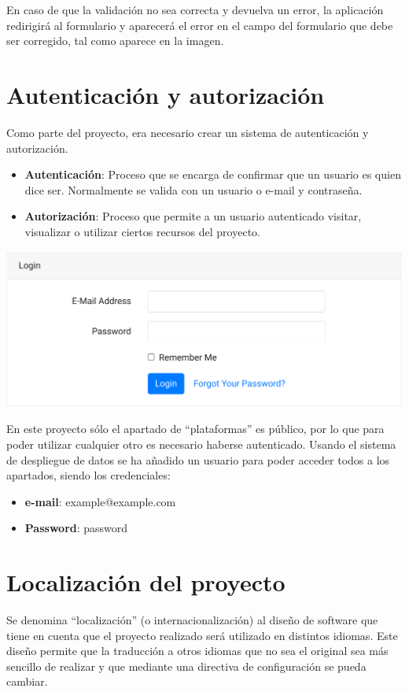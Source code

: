 \documentclass{\ClassPath/viu-tfm-template}
\begin{document}
En caso de que la validación no sea correcta y devuelva un error, la aplicación redirigirá al formulario y aparecerá el error en el campo del formulario que debe ser corregido, tal como aparece en la imagen.

\section{Autenticación y autorización}
Como parte del proyecto, era necesario crear un sistema de autenticación y autorización.

\vspace{-1em}
\begin{itemize}
    \item \textbf{Autenticación}: Proceso que se encarga de confirmar que un usuario es quien dice ser. Normalmente se valida con un usuario o e-mail y contraseña.
    \item \textbf{Autorización}: Proceso que permite a un usuario autenticado visitar, visualizar o utilizar ciertos recursos del proyecto.
\end{itemize}
\vspace{-1em}

\begin{center}
    \includegraphics[width=0.5\linewidth]{img/login.png}
\end{center}

En este proyecto sólo el apartado de “plataformas” es público, por lo que para poder utilizar cualquier otro es necesario haberse autenticado. Usando el sistema de despliegue de datos se ha añadido un usuario para poder acceder todos a los apartados, siendo los credenciales:

\vspace{-1em}
\begin{itemize}
    \item \textbf{e-mail}: example@example.com
    \item \textbf{Password}: password
\end{itemize}
\vspace{-1em}



\section{Localización del proyecto}
Se denomina “localización” (o internacionalización) al diseño de software que tiene en cuenta que el proyecto realizado será utilizado en distintos idiomas. Este diseño permite que la traducción a otros idiomas que no sea el original sea más sencillo de realizar y que mediante una directiva de configuración se pueda cambiar.
\end{document}
